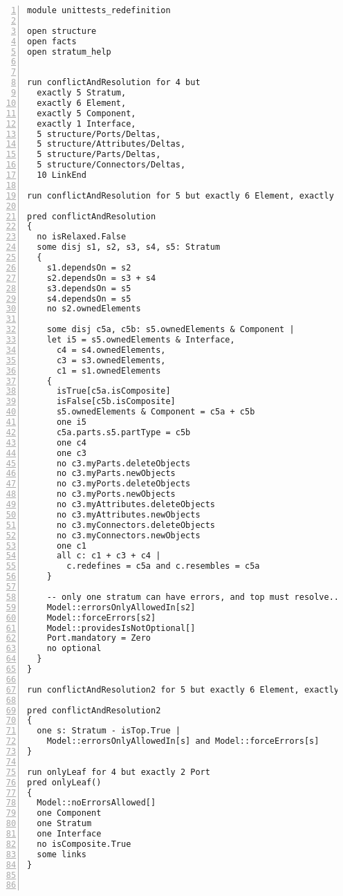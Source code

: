 \lstset{frame=tb, aboveskip=12pt, belowskip=-3pt, breaklines=true, basicstyle=\tiny\ttfamily, tabsize=2, mathescape=true}
\begin{lstlisting}[caption={unittests\_redefinition.als}, numbers=left]
module unittests_redefinition

open structure
open facts
open stratum_help


run conflictAndResolution for 4 but
  exactly 5 Stratum,
  exactly 6 Element,
  exactly 5 Component,
  exactly 1 Interface,
  5 structure/Ports/Deltas,
  5 structure/Attributes/Deltas,
  5 structure/Parts/Deltas,
  5 structure/Connectors/Deltas,
  10 LinkEnd

run conflictAndResolution for 5 but exactly 6 Element, exactly 5 Component, exactly 1 Interface, 10 LinkEnd

pred conflictAndResolution
{
  no isRelaxed.False
  some disj s1, s2, s3, s4, s5: Stratum
  {
    s1.dependsOn = s2
    s2.dependsOn = s3 + s4
    s3.dependsOn = s5
    s4.dependsOn = s5
    no s2.ownedElements
    
    some disj c5a, c5b: s5.ownedElements & Component |
    let i5 = s5.ownedElements & Interface,
      c4 = s4.ownedElements,
      c3 = s3.ownedElements,
      c1 = s1.ownedElements
    {
      isTrue[c5a.isComposite]
      isFalse[c5b.isComposite]
      s5.ownedElements & Component = c5a + c5b
      one i5
      c5a.parts.s5.partType = c5b
      one c4
      one c3
      no c3.myParts.deleteObjects
      no c3.myParts.newObjects
      no c3.myPorts.deleteObjects
      no c3.myPorts.newObjects
      no c3.myAttributes.deleteObjects
      no c3.myAttributes.newObjects
      no c3.myConnectors.deleteObjects
      no c3.myConnectors.newObjects
      one c1
      all c: c1 + c3 + c4 |
        c.redefines = c5a and c.resembles = c5a
    }    
    
    -- only one stratum can have errors, and top must resolve...
    Model::errorsOnlyAllowedIn[s2]
    Model::forceErrors[s2]
    Model::providesIsNotOptional[]
    Port.mandatory = Zero
    no optional
  }
}

run conflictAndResolution2 for 5 but exactly 6 Element, exactly 5 Component, exactly 1 Interface

pred conflictAndResolution2
{
  one s: Stratum - isTop.True |
    Model::errorsOnlyAllowedIn[s] and Model::forceErrors[s]
}

run onlyLeaf for 4 but exactly 2 Port
pred onlyLeaf()
{
  Model::noErrorsAllowed[]
  one Component
  one Stratum
  one Interface
  no isComposite.True
  some links
}



\end{lstlisting}
